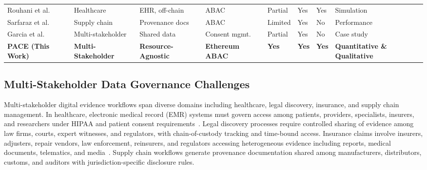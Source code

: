 \documentclass[pdflatex,sn-mathphys-num]{sn-jnl}
\begin{document}
\begin{table}[!htbp]
\begin{tabular}{@{}p{2.5cm}p{1.8cm}p{2cm}p{1.8cm}p{1.6cm}p{1.4cm}p{1.4cm}p{1.8cm}@{}}
		\addlinespace[0.5ex]
		Rouhani et al.~\cite{rouhani2021distributed}    & Healthcare              & EHR, off-chain                              & ABAC                     & Partial               & Yes                        & Yes                         & Simulation            \\
		\addlinespace[0.5ex]
		Sarfaraz et al.~\cite{sarfaraz2023accesschain}  & Supply chain            & Provenance docs                             & ABAC                     & Limited               & Yes                        & No                          & Performance           \\
		\addlinespace[0.5ex]
		Garcia et al.~\cite{garcia2022blockchainmulti}  & Multi-stakeholder       & Shared data                                 & Consent mgmt.            & Partial               & Yes                        & No                          & Case study            \\
		\midrule
		\textbf{PACE (This Work)}                      & \textbf{Multi-Stakeholder} & \textbf{Resource-Agnostic} & \textbf{Ethereum ABAC} & \textbf{Yes}  & \textbf{Yes}               & \textbf{Yes}      & \textbf{Quantitative \& Qualitative} \\
		\bottomrule
	\end{tabular}
	\end{table}

\subsection{Multi-Stakeholder Data Governance Challenges}
Multi-stakeholder digital evidence workflows span diverse domains including healthcare, legal discovery, insurance, and supply chain management. In healthcare, electronic medical record (EMR) systems must govern access among patients, providers, specialists, insurers, and researchers under HIPAA and patient consent requirements~\cite{liang2017mhealth, theodouli2018healthcare, sun2020emr, rana2022healthcare}. Legal discovery processes require controlled sharing of evidence among law firms, courts, expert witnesses, and regulators, with chain-of-custody tracking and time-bound access. Insurance claims involve insurers, adjusters, repair vendors, law enforcement, reinsurers, and regulators accessing heterogeneous evidence including reports, medical documents, telematics, and media~\cite{sun2020insurance, liu2021auto, raikwar2018insurance, tarr2018insurance, singh2019ubi}. Supply chain workflows generate provenance documentation shared among manufacturers, distributors, customs, and auditors with jurisdiction-specific disclosure rules.
\end{document}
